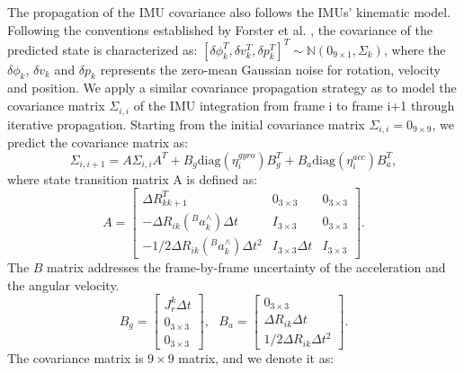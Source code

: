 The propagation of the IMU covariance also follows the IMUs' kinematic model.
Following the conventions established by Forster et al. \cite{forster2015imu}, the covariance of the predicted state is characterized as:
$[\delta \phi_{k}^T, \delta v_{k}^T, \delta p_{k}^T]^T \sim \mathbb{N}(0_{9 \times 1}, \Sigma_{k})$, where the $\delta \phi_{k}$,  $\delta v_{k}$ and $ \delta p_{k}$ represents the zero-mean Gaussian noise for rotation, velocity and position.
We apply a similar covariance propagation strategy as \cite{forster2015imu} to model the covariance matrix $\Sigma_{i,i}$ of the IMU integration from frame i to frame i+1 through iterative propagation. Starting from the initial covariance matrix $\Sigma_{i,i} = 0_{9 \times 9}$, we predict the covariance matrix as:
    \begin{equation}
    \label{formula: 4.cov}
        \Sigma_{i,i+1} 
          = A \Sigma_{i,i} A^T + B_g \mathrm{diag}(\eta^{gyro}_i) B_g^T + B_a \mathrm{diag}(\eta^{acc}_i) B_a^T,
    \end{equation}
where state transition matrix A is defined as:
             \begin{equation}A =
            \begin{bmatrix}
                  {\Delta}R_{kk+1}^T & 0_{3 \times 3}  & 0_{3 \times 3} \\
                  -{\Delta}R_{ik} ({}^Ba_k^{\wedge}) {\Delta}t & I_{3 \times 3} & 0_{3 \times 3} \\
                  -1/2{\Delta}R_{ik} ({}^Ba_k^{\wedge}) {\Delta}t^2 & I_{3 \times 3} {\Delta}t & I_{3 \times 3}
                  \end{bmatrix}.
                \end{equation}
The $B$ matrix addresses the frame-by-frame uncertainty of the acceleration and the angular velocity. 
\begin{equation}
            B_g = \begin{bmatrix}
                    J_r^k \Delta t  \\
                    0_{3 \times 3}  \\
                    0_{3 \times 3} 
                \end{bmatrix}, \ \ \ 
                B_a = \begin{bmatrix}
                    0_{3 \times 3} \\
                    {\Delta}R_{ik} {\Delta}t  \\
                    1/2 {\Delta}R_{ik} {\Delta}t^2
                \end{bmatrix}.
\end{equation}
The covariance matrix is $9 \times 9$ matrix, and we denote it as:

